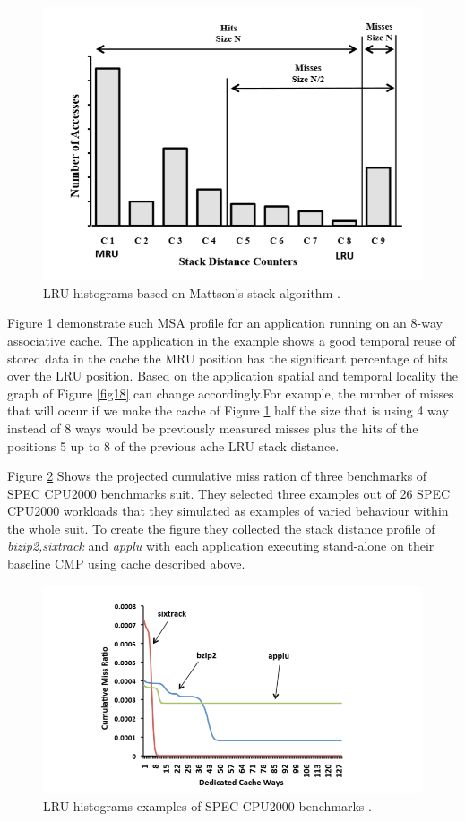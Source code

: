 \documentclass{report}
\begin{document}
\begin{figure}[h!]
\includegraphics[width=1\textwidth]{./fig19}
\caption{    LRU histograms based on Mattson’s stack algorithm .}
\label{fig19}
\end{figure}

Figure \ref{fig19} demonstrate such MSA profile for an application running on an $8$-way associative cache. The application in the example shows a good temporal reuse of stored data in the cache the MRU position has the significant percentage of hits over the LRU position. Based on the application spatial and temporal locality the graph of Figure \ref{fig18} can change accordingly.For example, the number of misses that will occur if we make the cache of Figure \ref{fig19} half the size that is using 4 way instead of 8 ways would be previously measured misses plus the hits of the positions 5 up to 8 of the previous ache LRU stack distance. \vspace{.8cm}


Figure \ref{fig20} Shows the projected cumulative miss ration of three benchmarks of SPEC CPU2000 benchmarks suit. They selected three examples out of 26 SPEC CPU2000 workloads that they simulated as examples of varied behaviour within the whole suit. To create the figure they collected the stack distance profile of \emph{bizip2,sixtrack} and \emph{applu} with each application executing stand-alone on their baseline CMP using cache described above.


\begin{figure}[t]
\includegraphics[width=1\textwidth]{./fig20}
\caption{    LRU histograms examples of SPEC CPU2000 benchmarks .}
\label{fig20}
\end{figure}
\end{document}
